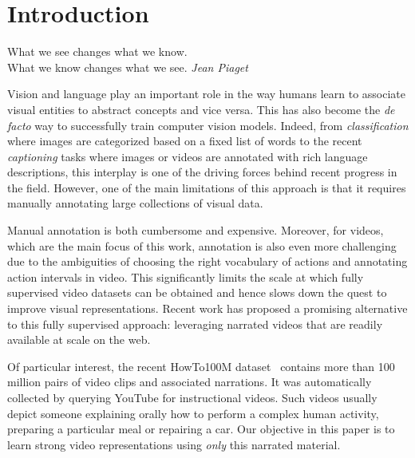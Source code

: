 \documentclass[10pt,twocolumn,letterpaper]{article}
\begin{document}
\section{Introduction}

\epigraph{What we see changes what we know. \\ What we know changes what we see. \hspace{1.5em} \textit{Jean Piaget}}{}
Vision and language play an important role in the way humans learn to associate visual entities to abstract concepts and vice versa.
This has also become the \emph{de facto} way to successfully train computer vision models.
Indeed, from \emph{classification} where images are categorized based on a fixed list of words to the recent \emph{captioning} tasks where images or videos are annotated with rich language descriptions, this interplay is one of the driving forces behind recent progress in the field.
However, one of the main limitations of this approach is that it requires manually annotating large collections of visual data.

\renewcommand{\thefootnote}{\fnsymbol{footnote}}
\renewcommand*{\thefootnote}{\arabic{footnote}}


Manual annotation is both cumbersome and expensive.
Moreover, for videos, which are the main focus of this work, annotation is also even more challenging due to the  ambiguities of choosing the right vocabulary of actions and annotating action intervals in video.
This significantly limits the scale at which fully supervised video datasets can be obtained and hence slows down the quest to improve visual representations.
Recent work has proposed a promising alternative to this fully supervised approach:  leveraging narrated videos that are readily available at scale on the web.

Of particular interest, the recent HowTo100M dataset~\cite{miech19howto100m} contains more than 100 million pairs of video clips and associated narrations.
It was automatically collected by querying YouTube for instructional videos.
Such videos usually depict someone explaining orally how to perform a complex human activity, \eg preparing a particular meal or repairing a car.
Our objective in this paper is to learn strong video representations using \emph{only} this narrated material.
\end{document}
